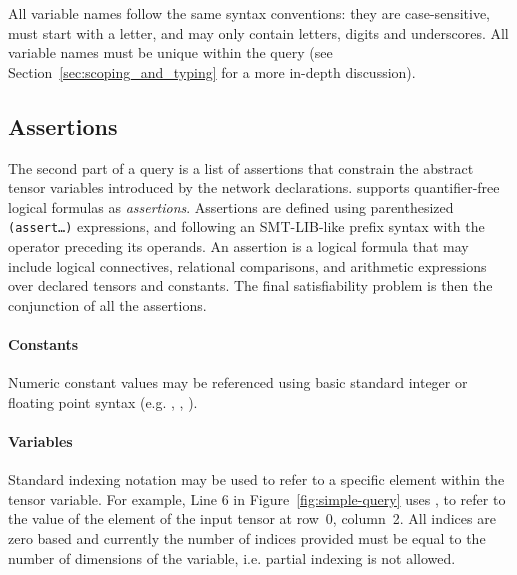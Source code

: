All variable names follow the same syntax conventions: they are case-sensitive, must start with a letter, and may only contain letters, digits and underscores. All variable names must be unique within the query (see Section~\ref{sec:scoping_and_typing} for a more in-depth discussion). 



\subsection{Assertions}

The second part of a \vnnlib{} query is a list of assertions that constrain the abstract tensor variables introduced by the network declarations. \vnnlib{} supports quantifier-free logical formulas as \textit{assertions}. Assertions are defined using parenthesized \texttt{(assert\ldots)} expressions, and following an SMT-LIB-like prefix syntax with the 
operator preceding its operands. An assertion is a logical formula that may include logical connectives, relational comparisons, and arithmetic expressions over declared tensors and constants.
The final satisfiability problem is then the conjunction of all the assertions.
 
\paragraph{Constants}

Numeric constant values may be referenced using basic standard integer or floating point syntax (e.g. , , ). 

\paragraph{Variables} 

Standard indexing notation may be used to refer to a specific element within the tensor variable. For example, Line 6 in Figure~\ref{fig:simple-query} uses , to refer to the value of the element of the input tensor at row~0, column~2. All indices are zero based and currently the number of indices provided must be equal to the number of dimensions of the variable, i.e. partial indexing is not allowed.

